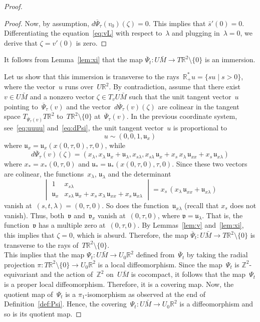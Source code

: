 \documentclass[AHL,Unicode,longabstracts,published]{cedram}
\newcommand{\Z}{\mathbb{Z}}
\newcommand{\R}{\mathbb{R}}
\newcommand{\bu}{\mathfrak{u}}
\newcommand{\bv}{\mathfrak{v}}
\begin{document}
\begin{proof}
\begin{proof}
Now, by assumption, $d\overline{\Psi}_\tau(v_0)(\zeta)=0$. This implies that $\bar{s}'(0)=0$. Differentiating the equation~\eqref{eq:vL} with respect to~$\lambda$ and plugging in~$\lambda=0$, we derive that $\zeta=v'(0)$ is zero.
\end{proof}

It follows from Lemma~\ref{lem:xi} that the map $\overline{\Psi}_t:U\bar{M} \to T \R^2 \setminus\{0\}$ is an immersion.

Let us show that this immersion is transverse to the rays~\mbox{$\R_+^* u = \{ su \mid s >0\}$}, where the vector~$u$ runs over~$U\R^2$. By contradiction, assume that there exist $v \in U\bar{M}$ and a nonzero vector $\zeta \in T_v U\bar{M}$ such that the unit tangent vector~$u$ pointing to~$\overline{\Psi}_\tau(v)$ and the vector~$d\overline{\Psi}_\tau(v)(\zeta)$ are colinear in the tangent space $T_{\overline{\Psi}_\tau(v)} T\R^2$ to~$T\R^2 \setminus \{0\}$ at~$\overline{\Psi}_\tau(v)$. In the previous coordinate system, see~\eqref{eq:uuuu} and~\eqref{eq:dPsi}, the unit tangent vector~$u$ is proportional to
\[
u \sim (0,0,1,\bu_x)
\]
where $\bu_x=\bu_x(x(0,\tau,0),\tau,0)$, while
\[
d\overline{\Psi}_\tau(v)(\zeta) = \left(x_\lambda, x_\lambda \, \bu_x + \bu_\lambda, x_{s \lambda}, x_{s \lambda} \, \bu_x + x_s \, x_\lambda \, \bu_{xx} + x_s \, \bu_{x \lambda} \right)
\]
where $x_*=x_*(0,\tau,0)$ and $\bu_*=\bu_*(x(0,\tau,0),\tau,0)$. Since these two vectors are colinear, the functions~$x_\lambda$, $\bu_\lambda$ and the determinant
\[
\begin{vmatrix}
1 & x_{s \lambda} \\
\bu_x & x_{s \lambda} \, \bu_x + x_s \, x_\lambda \, \bu_{xx} + x_s \, \bu_{x \lambda}
\end{vmatrix} = x_s \, (x_\lambda \, \bu_{xx} + \bu_{x \lambda})
\]
vanish at~$(s,t,\lambda)=(0,\tau,0)$. So does the function~$\bu_{x \lambda}$ (recall that $x_s$ does not vanish). Thus, both~$\bv$ and~$\bv_x$ vanish at~$(0,\tau,0)$, where $\bv=\bu_\lambda$. That is, the function~$\bv$ has a multiple zero at~$(0,\tau,0)$. By Lemmas~\ref{lem:v} and~\ref{lem:xi}, this implies that $\zeta=0$, which is absurd. Therefore, the map $\overline{\Psi}_t:U\bar{M} \to T\R^2 \setminus \{0\}$ is transverse to the rays of~$T\R^2 \setminus \{0\}$. \\

This implies that the map $\Psi_t: U\bar{M} \to U_0\R^2$ defined from~$\overline{\Psi}_t$ by taking the radial projection $\pi:T\R^2 \setminus \{0\} \to U_0\R^2$ is a local diffeomorphism. Since the map~$\Psi_t$ is $\Z^2$-equivariant and the action of~$\Z^2$ on~$U\bar{M}$ is cocompact, it follows that the map~$\Psi_t$ is a proper local diffeomorphism. Therefore, it is a covering map. Now, the quotient map of~$\Psi_t$ is a $\pi_1$-isomorphism as observed at the end of Definition~\ref{def:Psi}. Hence, the covering~$\Psi_t:U\bar{M} \to U_0\R^2$ is a diffeomorphism and so is its quotient map.
\end{proof}
\end{document}

